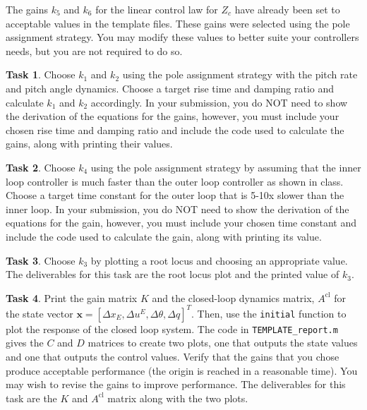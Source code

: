 \documentclass{article}
\theoremstyle{definition}
\newtheorem{task}{Task}
\begin{document}
The gains $k_5$ and $k_6$ for the linear control law for $Z_c$ have already been set to acceptable values in the template files. These gains were selected using the pole assignment strategy. You may modify these values to better suite your controllers needs, but you are not required to do so.

\begin{task}
    Choose $k_1$ and $k_2$ using the pole assignment strategy with the pitch rate and pitch angle dynamics. Choose a target rise time and damping ratio and calculate $k_1$ and $k_2$ accordingly. In your submission, you do NOT need to show the derivation of the equations for the gains, however, you must include your chosen rise time and damping ratio and include the code used to calculate the gains, along with printing their values.
\end{task}

\begin{task}
    Choose $k_4$ using the pole assignment strategy by assuming that the inner loop controller is much faster than the outer loop controller as shown in class. Choose a target time constant for the outer loop that is 5-10x slower than the inner loop. In your submission, you do NOT need to show the derivation of the equations for the gain, however, you must include your chosen time constant and include the code used to calculate the gain, along with printing its value.
\end{task}

\begin{task}
    Choose $k_3$ by plotting a root locus and choosing an appropriate value. The deliverables for this task are the root locus plot and the printed value of $k_3$.
\end{task}

\begin{task}
    Print the gain matrix $K$ and the closed-loop dynamics matrix, $A^\text{cl}$ for the state vector $\mathbf{x} = [\Delta x_E, \Delta u^E, \Delta \theta, \Delta q]^T$.
    Then, use the \texttt{initial} function to plot the response of the closed loop system. The code in \texttt{TEMPLATE\_report.m} gives the $C$ and $D$ matrices to create two plots, one that outputs the state values and one that outputs the control values. Verify that the gains that you chose produce acceptable performance (the origin is reached in a reasonable time). You may wish to revise the gains to improve performance.
    The deliverables for this task are the $K$ and $A^\text{cl}$ matrix along with the two plots.
\end{task}
\end{document}
